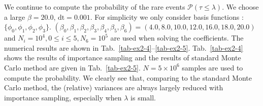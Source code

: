 \documentclass[final]{siamltex}
\begin{document}
We continue to compute the probability of the rare events $\mathcal{P}(\tau
\le \lambda)$. We choose a large $\beta = 20.0$, $\mbox{dt} = 0.001$. 
For simplicity we only consider basis functions : 
$\{\phi_0, \phi_1, \phi_2, \phi_3\}$. $(\beta_0, \beta_1 , \beta_2,
\beta_3, \beta_4, \beta_5, \beta_6) = (4.0, 8.0, 10.0, 12.0, 16.0, 18.0,
20.0)$ and $N_i = 10^4, 0\le i \le 5, N_6 = 10^5$ are used when solving the coefficients.
The numerical results are shown in Tab.~\ref{tab-ex2-4}--\ref{tab-ex2-5}.
Tab.~\ref{tab-ex2-4} shows the
results of importance sampling and the results
of standard Monte Carlo method are given in Tab.~\ref{tab-ex2-5}. $N=5 \times
10^{6}$ samples are used to compute the probability. We clearly
see that, comparing to the standard Monte Carlo method, the (relative) variances are always largely reduced with importance sampling, especially when $\lambda$ is small. 
\end{document}
